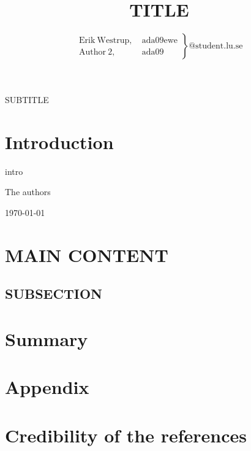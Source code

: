 \documentclass[10pt,journal,compsoc,final,twoside,twocolumn,a4paper]{IEEEtran}
\begin{document}
\title{TITLE}

\author{%
\begin{math}
\left. \begin{array}{ll} 
	\mathrm{Erik~Westrup,} & \mathrm{~ada09ewe} \\
	\mathrm{Author~2,} & \mathrm{~ada09}
\end{array} \right\}\mathrm{@student.lu.se}
\end{math}
}

{SUBTITLE}

\maketitle
\IEEEdisplaynotcompsoctitleabstractindextext%
\IEEEpeerreviewmaketitle%

\section{Introduction}

 intro


\hfill The authors

\hfill \today


\section{MAIN CONTENT}
\lipsum[1--2]

\subsection{SUBSECTION}
\lipsum[1]

\section{Summary}




\newpage
\section*{Appendix}
\appendices%
\section{Credibility of the references}

\emph{\cite{dummy:ref}} 
\end{document}
